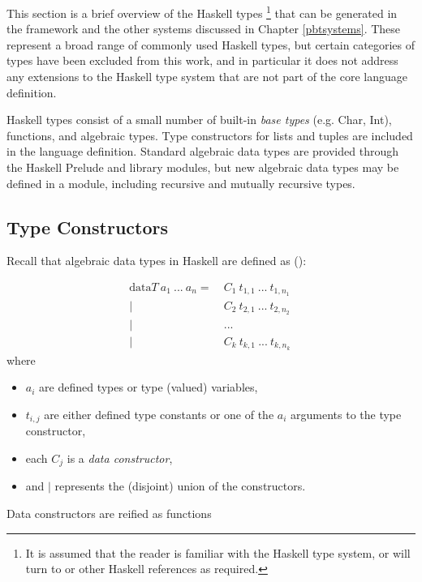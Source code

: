 
This section is a brief overview of the Haskell types%
\footnote{It is assumed that the reader is familiar with the Haskell type system,
or will turn to \cite{Haskell2010} or other Haskell references as required.} 
that can be generated in the \GC framework
and the other \pbt systems discussed in Chapter \ref{pbtsystems}.
These represent a broad range of commonly used Haskell types,
but certain categories of types have been excluded from this work,
and in particular it does not address any extensions to the Haskell type system
that are not part of the core language definition.

Haskell types consist of a small number of built-in \emph{base types} (e.g. Char, Int),
functions,  and algebraic types.
Type constructors for lists and tuples are included in the language definition.
Standard algebraic data types are provided through the Haskell Prelude and library modules,
but new algebraic data types may be defined in a module,
including recursive and mutually recursive types.


\subsection{Type Constructors}
Recall that algebraic data types in Haskell are defined as (\cite{Haskell2010}):

\begin{align*}
\text{data} T\ a_1\ ...\ a_n =\ & C_1\ t_{1,1}\ ...\ t_{1,n_1}\ \\
  \vert\ & C_2\ t_{2,1}\ ...\ t_{2,n_2}\  \\
  \vert\ & ...\ \\
  \vert\ & C_k\ t_{k,1}\ ...\ t_{k,n_k}
\end{align*}
\noindent
where 
\begin{itemize}
\item $a_i$ are defined types or type (valued) variables,
\item $t_{i,j}$ are either defined type constants or one of the $a_i$ arguments to the type constructor,
\item each $C_j$ is a \emph{data constructor},
\item and $ \vert $ represents the (disjoint) union of the constructors.
\end{itemize}
\noindent
Data constructors are reified as functions

